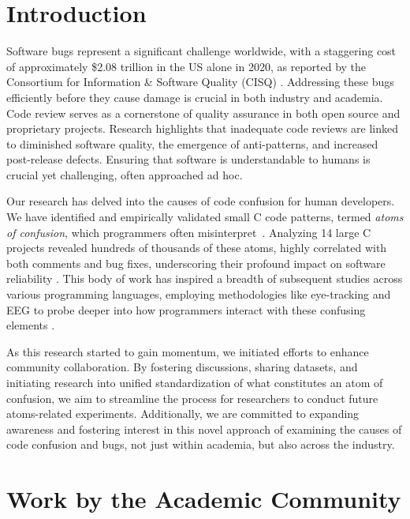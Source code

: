 \documentclass[conference]{IEEEtran}
\begin{document}
\section{Introduction}

Software bugs represent a significant challenge worldwide, 
with a staggering cost of approximately \$2.08 trillion in the 
US alone in 2020, as reported by the Consortium for 
Information \& Software Quality (CISQ) \cite{CPSQ2020}. 
Addressing these bugs efficiently before they cause damage is 
crucial in both industry and academia.
%
Code review serves as a cornerstone of quality assurance in 
both open source and proprietary projects. Research highlights 
that inadequate code reviews are linked to diminished software 
quality, the emergence of anti-patterns, and increased 
post-release defects. %
Ensuring that software is understandable to 
humans is crucial yet challenging, often approached ad hoc.

Our research has delved into the causes of code confusion for 
human developers. We have identified and empirically validated 
small C code patterns, termed \emph{atoms of confusion}, which 
programmers often misinterpret~\cite{gopstein2017understanding}. Analyzing 14 large C projects 
revealed hundreds of thousands of these atoms, highly 
correlated with both comments and bug fixes, underscoring 
their profound impact on software reliability 
\cite{gopstein2018prevalence}.
%
This body of work has inspired a breadth of subsequent studies 
across various programming languages, employing methodologies 
like eye-tracking and EEG to probe deeper into how programmers 
interact with these confusing elements 
\cite{langhout2021atoms, mendes2021bohr, mendes2022dazed, 
torres2023investigation, dacosta2023seeing, 
Manor2018AtomsConfusionSwift, yeh2017detecting}.

As this research started to gain momentum, we initiated 
efforts to enhance community collaboration. By fostering 
discussions, sharing datasets, and initiating research into 
unified standardization of what constitutes an atom of 
confusion, we aim to streamline the process for researchers to 
conduct future atoms-related experiments. Additionally, we are 
committed to expanding awareness and fostering interest in 
this novel approach of examining the causes of code confusion 
and bugs, not just within academia, but also across the 
industry.

\section{Work by the Academic Community}
\end{document}
